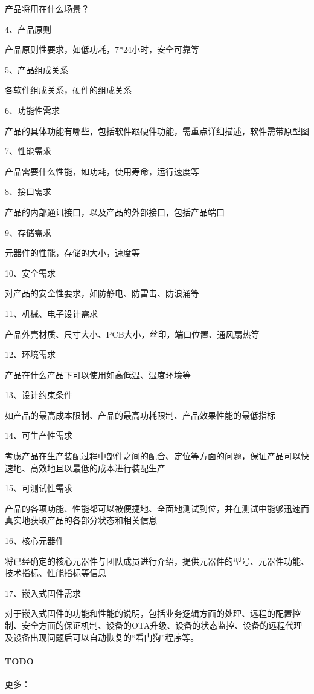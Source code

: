 \documentclass[letterpaper,10pt,english]{sphinxmanual}
\begin{document}
产品将用在什么场景？

4、产品原则

产品原则性要求，如低功耗，7*24小时，安全可靠等

5、产品组成关系

各软件组成关系，硬件的组成关系

6、功能性需求

产品的具体功能有哪些，包括软件跟硬件功能，需重点详细描述，软件需带原型图

7、性能需求

产品需要什么性能，如功耗，使用寿命，运行速度等

8、接口需求

产品的内部通讯接口，以及产品的外部接口，包括产品端口

9、存储需求

元器件的性能，存储的大小，速度等

10、安全需求

对产品的安全性要求，如防静电、防雷击、防浪涌等

11、机械、电子设计需求

产品外壳材质、尺寸大小、PCB大小，丝印，端口位置、通风扇热等

12、环境需求

产品在什么产品下可以使用如高低温、湿度环境等

13、设计约束条件

如产品的最高成本限制、产品的最高功耗限制、产品效果性能的最低指标

14、可生产性需求

考虑产品在生产装配过程中部件之间的配合、定位等方面的问题，保证产品可以快速地、高效地且以最低的成本进行装配生产

15、可测试性需求

产品的各项功能、性能都可以被便捷地、全面地测试到位，并在测试中能够迅速而真实地获取产品的各部分状态和相关信息

16、核心元器件

将已经确定的核心元器件与团队成员进行介绍，提供元器件的型号、元器件功能、技术指标、性能指标等信息

17、嵌入式固件需求

对于嵌入式固件的功能和性能的说明，包括业务逻辑方面的处理、远程的配置控制、安全方面的保证机制、设备的OTA升级、设备的状态监控、设备的远程代理及设备出现问题后可以自动恢复的“看门狗”程序等。


\paragraph{TODO}
\label{\detokenize{chapter_project/AI_hardware:todo}}
更多：
\end{document}
